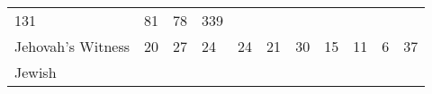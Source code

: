 \documentclass[]{article}
\begin{document}
\begin{longtable}[]{@{}lllllllllll@{}}
\begin{minipage}[t]{0.06\columnwidth}
131\strut
\end{minipage} & \begin{minipage}[t]{0.06\columnwidth}\raggedright\strut
81\strut
\end{minipage} & \begin{minipage}[t]{0.04\columnwidth}\raggedright\strut
78\strut
\end{minipage} & \begin{minipage}[t]{0.11\columnwidth}\raggedright\strut
339\strut
\end{minipage}\tabularnewline
\begin{minipage}[t]{0.14\columnwidth}\raggedright\strut
Jehovah's Witness\strut
\end{minipage} & \begin{minipage}[t]{0.04\columnwidth}\raggedright\strut
20\strut
\end{minipage} & \begin{minipage}[t]{0.05\columnwidth}\raggedright\strut
27\strut
\end{minipage} & \begin{minipage}[t]{0.05\columnwidth}\raggedright\strut
24\strut
\end{minipage} & \begin{minipage}[t]{0.05\columnwidth}\raggedright\strut
24\strut
\end{minipage} & \begin{minipage}[t]{0.05\columnwidth}\raggedright\strut
21\strut
\end{minipage} & \begin{minipage}[t]{0.05\columnwidth}\raggedright\strut
30\strut
\end{minipage} & \begin{minipage}[t]{0.06\columnwidth}\raggedright\strut
15\strut
\end{minipage} & \begin{minipage}[t]{0.06\columnwidth}\raggedright\strut
11\strut
\end{minipage} & \begin{minipage}[t]{0.04\columnwidth}\raggedright\strut
6\strut
\end{minipage} & \begin{minipage}[t]{0.11\columnwidth}\raggedright\strut
37\strut
\end{minipage}\tabularnewline
\begin{minipage}[t]{0.14\columnwidth}\raggedright\strut
Jewish\strut
\end{minipage} & \begin{minipage}[t]{0.04\columnwidth}\raggedright\strut

\end{minipage}
\end{longtable}
\end{document}
